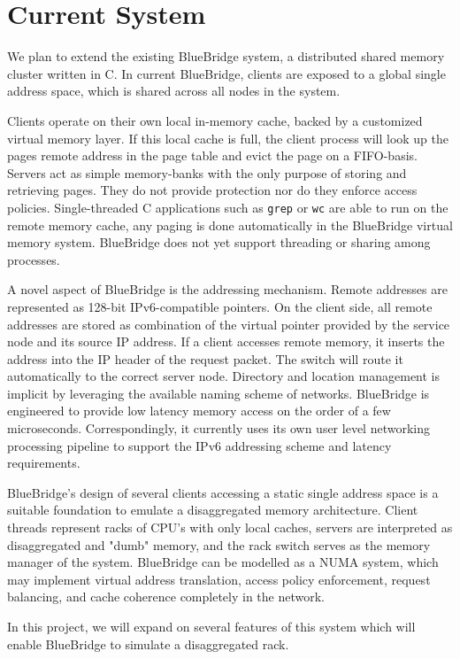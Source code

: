 \section{Current System}
\label{sec:current}
We plan to extend the existing BlueBridge system, a distributed shared
memory cluster written in C. In current BlueBridge, clients are
exposed to a global single address space, which is shared across all
nodes in the system.

Clients operate on their own local in-memory cache, backed by a
customized virtual memory layer. If this local cache is full, the
client process will look up the pages remote address in the page table
and evict the page on a FIFO-basis.  Servers act as simple
memory-banks with the only purpose of storing and retrieving pages.
They do not provide protection nor do they enforce access policies.
Single-threaded C applications such as \texttt{grep} or \texttt{wc}
are able to run on the remote memory cache, any paging is done
automatically in the BlueBridge virtual memory system.  BlueBridge
does not yet support threading or sharing among processes.

A novel aspect of BlueBridge is the addressing mechanism. Remote
addresses are represented as 128-bit IPv6-compatible pointers. On the
client side, all remote addresses are stored as combination of the
virtual pointer provided by the service node and its source IP
address. If a client accesses remote memory, it inserts the address
into the IP header of the request packet. The switch will route it
automatically to the correct server node. Directory and location
management is implicit by leveraging the available naming scheme of
networks.  BlueBridge is engineered to provide low latency memory
access on the order of a few microseconds. Correspondingly, it
currently uses its own user level networking processing pipeline to
support the IPv6 addressing scheme and latency requirements.

BlueBridge's design of several clients accessing a static single
address space is a suitable foundation to emulate a disaggregated
memory architecture. Client threads represent racks of CPU's with only
local caches, servers are interpreted as disaggregated and "dumb"
memory, and the rack switch serves as the memory manager of the
system.  BlueBridge can be modelled as a NUMA system, which may
implement virtual address translation, access policy enforcement,
request balancing, and cache coherence completely in the network.

In this project, we will expand on several features of this system
which will enable BlueBridge to simulate a disaggregated rack.
